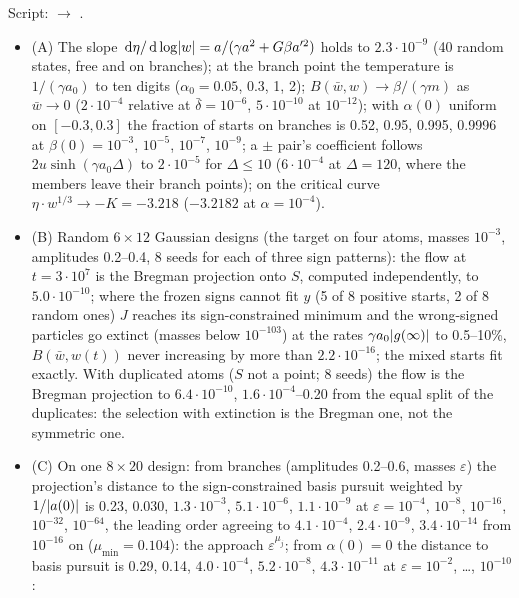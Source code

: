 Script:  $\to$ .
\begin{itemize}
  \item (A) The slope $\,\mathrm{d}\eta/\,\mathrm{d}\log\lvert w\rvert = a/(\gamma a^2 + G\beta a'^2)$ holds to $2.3\cdot10^{-9}$ (40 random
    states, free and on branches); at the branch point the temperature is $1/(\gamma a_0)$ to ten digits
    ($\alpha_0 = 0.05$, 0.3, 1, 2); $B(\bar w,w)\to\beta/(\gamma m)$ as $\bar w\to0$ ($2\cdot10^{-4}$ relative at
    $\bar\delta = 10^{-6}$, $5\cdot10^{-10}$ at $10^{-12}$); with $\alpha(0)$ uniform on $[-0.3,0.3]$ the fraction of
    starts on branches is 0.52, 0.95, 0.995, 0.9996 at $\beta(0) = 10^{-3}$, $10^{-5}$, $10^{-7}$, $10^{-9}$; a $\pm$
    pair's coefficient follows $2u\sinh(\gamma a_0\Delta)$ to $2\cdot10^{-5}$ for $\Delta\le10$ ($6\cdot10^{-4}$ at
    $\Delta = 120$, where the members leave their branch points); on the critical curve $\eta\cdot w^{1/3}\to-K = -3.218$
    ($-3.2182$ at $\alpha = 10^{-4}$).
  \item (B) Random $6\times12$ Gaussian designs (the target on four atoms, masses $10^{-3}$, amplitudes 0.2--0.4, 8 seeds
    for each of three sign patterns): the flow at $t = 3\cdot10^7$ is the Bregman projection onto $S$, computed
    independently, to $5.0\cdot10^{-10}$; where the frozen signs cannot fit $y$ (5 of 8 positive starts, 2 of 8 random
    ones) $J$ reaches its sign-constrained minimum and the wrong-signed particles go extinct (masses below $10^{-103}$)
    at the rates $\gamma a_0\lvert g(\infty)\rvert$ to 0.5--10\%, $B(\bar w,w(t))$ never increasing by more than
    $2.2\cdot10^{-16}$; the mixed starts fit exactly. With duplicated atoms ($S$ not a point; 8 seeds) the flow is the
    Bregman projection to $6.4\cdot10^{-10}$, $1.6\cdot10^{-4}$--0.20 from the equal split of the duplicates: the
    selection with extinction is the Bregman one, not the symmetric one.
  \item (C) On one $8\times20$ design: from branches (amplitudes 0.2--0.6, masses $\varepsilon$) the projection's
    distance to the sign-constrained basis pursuit weighted by $1/\lvert a(0)\rvert$ is 0.23, 0.030, $1.3\cdot10^{-3}$,
    $5.1\cdot10^{-6}$, $1.1\cdot10^{-9}$ at $\varepsilon = 10^{-4}$, $10^{-8}$, $10^{-16}$, $10^{-32}$, $10^{-64}$, the
    leading order agreeing to $4.1\cdot10^{-4}$, $2.4\cdot10^{-9}$, $3.4\cdot10^{-14}$ from $10^{-16}$ on
    ($\mu_{\min} = 0.104$): the approach $\varepsilon^{\mu_j}$; from $\alpha(0) = 0$ the distance to basis pursuit is
    0.29, 0.14, $4.0\cdot10^{-4}$, $5.2\cdot10^{-8}$, $4.3\cdot10^{-11}$ at $\varepsilon = 10^{-2}$, \dots, $10^{-10}$:

\end{itemize}
